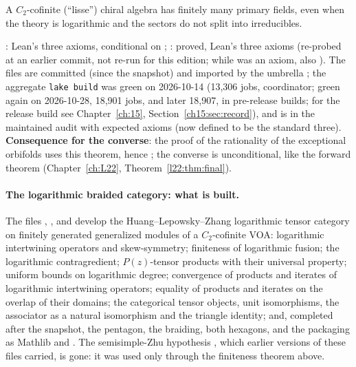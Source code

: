 \begin{physics}
A $C_2$-cofinite (``lisse'') chiral algebra has finitely many primary fields, even when the theory is logarithmic and the
sectors do not split into irreducibles.
\end{physics}

\begin{status}
: Lean's three axioms, conditional on ; :
proved, Lean's three axioms (re-probed at an earlier commit, not re-run for this edition; while  was an axiom, also ). The files are committed (since the snapshot) and imported by the
umbrella ; the aggregate \texttt{lake build} was green on 2026-10-14 (13,306 jobs,
coordinator; green again on 2026-10-28, 18{,}901 jobs, and later 18{,}907, in pre-release builds; for the release build see Chapter~\ref{ch:15}, Section~\ref{ch15:sec:record}), and  is in the maintained audit with
expected axioms  (now defined to be the standard three). \textbf{Consequence for the converse}: the
proof of the rationality of the exceptional orbifolds uses this theorem, hence ; the converse is
unconditional, like the forward theorem
(Chapter~\ref{ch:L22}, Theorem~\ref{l22:thm:final}).
\end{status}

\paragraph{The logarithmic braided category: what is built.} The files , ,  and  develop the
Huang--Lepowsky--Zhang logarithmic tensor category on finitely generated generalized modules of a $C_2$-cofinite VOA:
logarithmic intertwining operators and skew-symmetry; finiteness of logarithmic fusion; the logarithmic contragredient;
$P(z)$-tensor products with their universal property; uniform bounds on logarithmic degree; convergence of products and
iterates of logarithmic intertwining operators; equality of products and iterates on the overlap of their domains; the
categorical tensor objects, unit isomorphisms, the associator as a natural isomorphism and the triangle identity; and,
completed after the snapshot, the pentagon, the braiding, both hexagons, and the packaging as Mathlib
 and . The semisimple-Zhu hypothesis , which earlier versions of
these files carried, is gone: it was used only through the finiteness theorem above.

